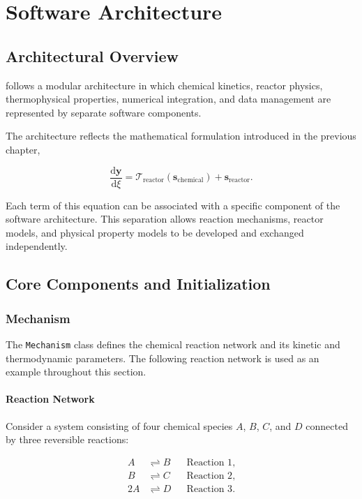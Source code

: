 \chapter{Software Architecture}

\section{Architectural Overview}

\VirtualReactor{} follows a modular architecture in which chemical kinetics,
reactor physics, thermophysical properties, numerical integration, and data
management are represented by separate software components.

The architecture reflects the mathematical formulation introduced in the
previous chapter,

\begin{equation}
    \frac{\mathrm{d}\mathbf{y}}{\mathrm{d}\xi}
    =
    \mathcal{T}_{\mathrm{reactor}}
    \left(
        \mathbf{s}_{\mathrm{chemical}}
    \right)
    +
    \mathbf{s}_{\mathrm{reactor}}.
\end{equation}

Each term of this equation can be associated with a specific component of
the software architecture. This separation allows reaction mechanisms,
reactor models, and physical property models to be developed and exchanged
independently.


\section{Core Components and Initialization}

\subsection{Mechanism}

The \texttt{Mechanism} class defines the chemical reaction network and its
kinetic and thermodynamic parameters. The following reaction network is used
as an example throughout this section.

\subsubsection{Reaction Network}

Consider a system consisting of four chemical species
$A$, $B$, $C$, and $D$ connected by three reversible reactions:

\begin{align}
    A &\rightleftharpoons B
    && \text{Reaction 1}, \\
    B &\rightleftharpoons C
    && \text{Reaction 2}, \\
    2A &\rightleftharpoons D
    && \text{Reaction 3}.
\end{align}

